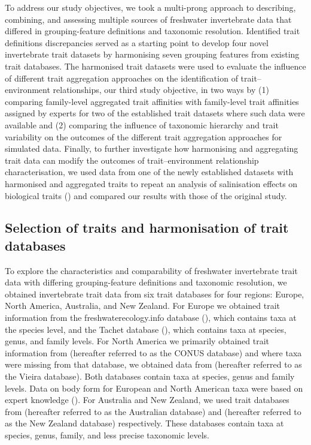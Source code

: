 \documentclass{article}
\begin{document}
To address our study objectives, we took a multi-prong approach to describing, combining, and assessing multiple sources of freshwater invertebrate data that differed in grouping-feature definitions and taxonomic resolution. Identified trait definitions discrepancies served as a starting point to develop four novel invertebrate trait datasets by harmonising seven grouping features from existing trait databases. The harmonised trait datasets were used to evaluate the influence of different trait aggregation approaches on the identification of trait–environment relationships, our third study objective, in two ways by (1) comparing family-level aggregated trait affinities with family-level trait affinities assigned by experts for two of the established trait datasets where such data were available and (2) comparing the influence of taxonomic hierarchy and trait variability on the outcomes of the different trait aggregation approaches for simulated data. Finally, to further investigate how harmonising and aggregating trait data can modify the outcomes of trait–environment relationship characterisation, we used data from one of the newly established datasets with harmonised and aggregated traits to repeat an analysis of salinisation effects on biological traits (\cite{szocs_effects_2014}) and compared our results with those of the original study.

\subsection*{Selection of traits and harmonisation of trait databases}

To explore the characteristics and comparability of freshwater invertebrate trait data with differing grouping-feature definitions and taxonomic resolution, we obtained invertebrate trait data from six trait databases for four regions: Europe, North America, Australia, and New Zealand. For Europe we obtained trait information from the freshwaterecology.info database (\cite{schmidt-kloiber_www.freshwaterecology.info_2015}), which contains taxa at the species level, and the Tachet database (\cite{ussegliopolatera_biological_2000}), which contains taxa at species, genus, and family levels. For North America we primarily obtained trait information from \citet{twardochleb_freshwater_nodate} (hereafter referred to as the CONUS database) and where taxa were missing from that database, we obtained data from \citet{vieira_database_nodate} (hereafter referred to as the Vieira database). Both databases contain taxa at species, genus and family levels. Data on body form for European and North American taxa were based on expert knowledge (\cite{polatera_personal_information_2020}). For Australia and New Zealand, we used trait databases from \citet{kefford_integrated_2020} (hereafter referred to as the Australian database) and \citet{Philips_and_Smith_NZ_DB_2018} (hereafter referred to as the New Zealand database) respectively. These databases contain taxa at species, genus, family, and less precise taxonomic levels.
\end{document}
